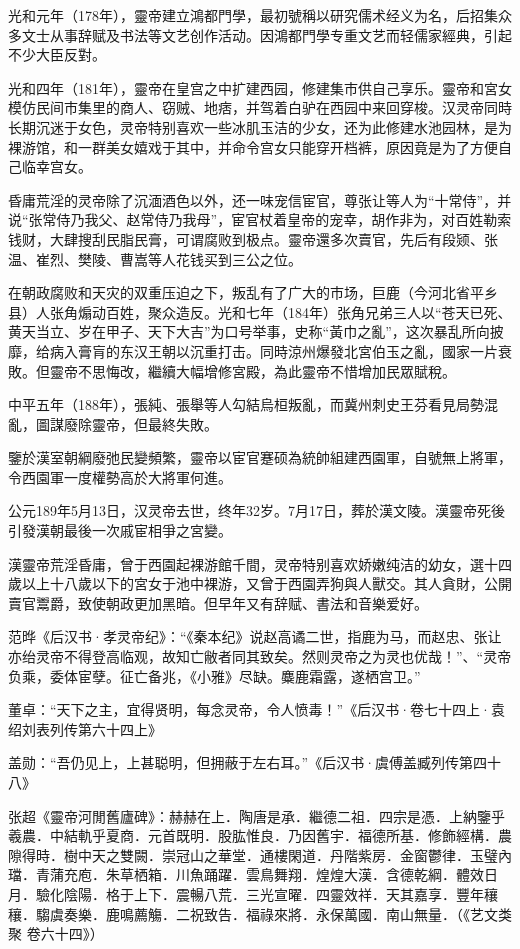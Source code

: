 光和元年（178年），靈帝建立鴻都門學，最初號稱以研究儒术经义为名，后招集众多文士从事辞赋及书法等文艺创作活动。因鴻都門學专重文艺而轻儒家經典，引起不少大臣反對。

光和四年（181年），靈帝在皇宫之中扩建西园，修建集市供自己享乐。靈帝和宮女模仿民间市集里的商人、窃贼、地痞，并驾着白驴在西园中来回穿梭。汉灵帝同時长期沉迷于女色，灵帝特别喜欢一些冰肌玉洁的少女，还为此修建水池园林，是为裸游馆，和一群美女嬉戏于其中，并命令宫女只能穿开档裤，原因竟是为了方便自己临幸宫女。

昏庸荒淫的灵帝除了沉湎酒色以外，还一味宠信宦官，尊张让等人为“十常侍”，并说“张常侍乃我父、赵常侍乃我母”，宦官杖着皇帝的宠幸，胡作非为，对百姓勒索钱财，大肆搜刮民脂民膏，可谓腐败到极点。靈帝還多次賣官，先后有段颎、张温、崔烈、樊陵、曹嵩等人花钱买到三公之位。

在朝政腐败和天灾的双重压迫之下，叛乱有了广大的市场，巨鹿（今河北省平乡县）人张角煽动百姓，聚众造反。光和七年（184年）张角兄弟三人以“苍天已死、黄天当立、岁在甲子、天下大吉”为口号举事，史称“黃巾之亂”，这次暴乱所向披靡，给病入膏肓的东汉王朝以沉重打击。同時涼州爆發北宮伯玉之亂，國家一片衰敗。但靈帝不思悔改，繼續大幅增修宮殿，為此靈帝不惜增加民眾賦稅。

中平五年（188年），張純、張舉等人勾結烏桓叛亂，而冀州刺史王芬看見局勢混亂，圖謀廢除靈帝，但最終失敗。

鑒於漢室朝綱廢弛民變頻繁，靈帝以宦官蹇硕為統帥組建西園軍，自號無上將軍，令西園軍一度權勢高於大將軍何進。

公元189年5月13日，汉灵帝去世，终年32岁。7月17日，葬於漢文陵。漢靈帝死後引發漢朝最後一次戚宦相爭之宮變。

漢靈帝荒淫昏庸，曾于西園起裸游館千間，灵帝特别喜欢娇嫩纯洁的幼女，選十四歲以上十八歲以下的宮女于池中裸游，又曾于西園弄狗與人獸交。其人貪財，公開賣官鬻爵，致使朝政更加黑暗。但早年又有辞赋、書法和音樂爱好。

范晔《后汉书·孝灵帝纪》：“《秦本纪》说赵高谲二世，指鹿为马，而赵忠、张让亦绐灵帝不得登高临观，故知亡敝者同其致矣。然则灵帝之为灵也优哉！”、“灵帝负乘，委体宦孽。征亡备兆，《小雅》尽缺。麋鹿霜露，遂栖宫卫。”

董卓：“天下之主，宜得贤明，每念灵帝，令人愤毒！”《后汉书·卷七十四上·袁绍刘表列传第六十四上》

盖勋：“吾仍见上，上甚聪明，但拥蔽于左右耳。”《后汉书·虞傅盖臧列传第四十八》

张超《靈帝河閒舊廬碑》：赫赫在上．陶唐是承．繼德二祖．四宗是憑．上納鑒乎羲農．中結軌乎夏商．元首既明．股肱惟良．乃因舊宇．福德所基．修飾經構．農隙得時．樹中天之雙闕．崇冠山之華堂．通樓閑道．丹階紫房．金窗鬱律．玉璧內璫．青蒲充庖．朱草栖箱．川魚踊躍．雲鳥舞翔．煌煌大漢．含德乾綱．體效日月．驗化陰陽．格于上下．震暢八荒．三光宣曜．四靈效祥．天其嘉享．豐年穰穰．騶虞奏樂．鹿鳴薦觴．二祝致告．福祿來將．永保萬國．南山無量．（《艺文类聚 卷六十四》）

